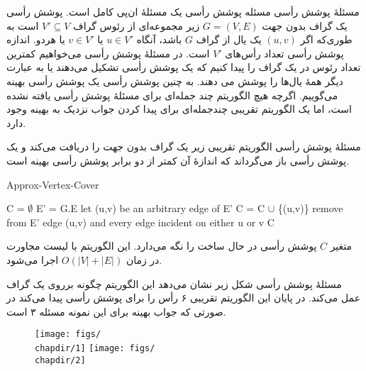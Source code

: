 \begin{itemframe}{‌مسئلهٔ پوشش رأسی}
\itm
مسئله پوشش رأسی
یک مسئلهٔ ان‌پی کامل است.
\itm
پوشش رأسی یک گراف بدون جهت
$G = (V,E)$
زیر مجموعه‌ای از رئوس گراف
$V' \subseteq V$
است به طوری‌که اگر
$(u,v)$
یک یال از گراف
$G$
باشد، آنگاه
$u \in V'$
یا
$v \in V'$
یا هردو. اندازه پوشش رأسی تعداد رأس‌های
$V'$
است.
\itm
در مسئلهٔ پوشش رأسی می‌خواهیم کمترین تعداد رئوس در یک گراف را پیدا کنیم که یک پوشش رأسی تشکیل می‌دهند یا به عبارت دیگر همهٔ یال‌ها را پوشش می دهند. به چنین پوشش رأسی یک پوشش رأسی بهینه
می‌گوییم.
\itm
اگرچه هیچ الگوریتم چند جمله‌ای برای مسئلهٔ پوشش رأسی یافته نشده است، اما یک الگوریتم تقریبی چندجمله‌ای برای پیدا کردن جواب نزدیک به بهینه وجود دارد.
\end{itemframe}


\begin{itemframe}{‌مسئلهٔ پوشش رأسی}
\itm
الگوریتم تقریبی زیر یک گراف بدون جهت را دریافت می‌کند و یک پوشش رأسی باز می‌گرداند که اندازهٔ آن کمتر از دو برابر پوشش رأسی بهینه است.
\begin{algorithm}[H]\alglr
  \caption{Approx-Vertex-Cover}
  \begin{algorithmic}[1]
   \State C = $\emptyset$
   \State E' = G.E
   			\State let (u,v) be an arbitrary edge of E'
   			\State C = C $\cup$ \{(u,v)\}
   			\State remove from E' edge (u,v) and every edge incident on either u or v
   	\EndWhile
   	\State \Return C
  \end{algorithmic}
  \label{alg:merge}
\end{algorithm}
\itm
متغیر
$C$
پوشش رأسی در حال ساخت را نگه می‌دارد. این الگوریتم با لیست مجاورت در زمان
$O(|V|+|E|)$
اجرا می‌شود.
\end{itemframe}


\begin{itemframe}{‌مسئلهٔ پوشش رأسی}
\itm
شکل زیر نشان می‌دهد این الگوریتم چگونه برروی یک گراف عمل می‌کند.
در پایان این الگوریتم تقریبی ۶ رأس را برای پوشش رأسی پیدا می‌کند در صورتی که جواب بهینه برای این نمونه مسئله ۳ است.
\begin{figure}
\texttt{[image: figs/\\chapdir/1]}
\texttt{[image: figs/\\chapdir/2]}
\end{figure}
\end{itemframe}



